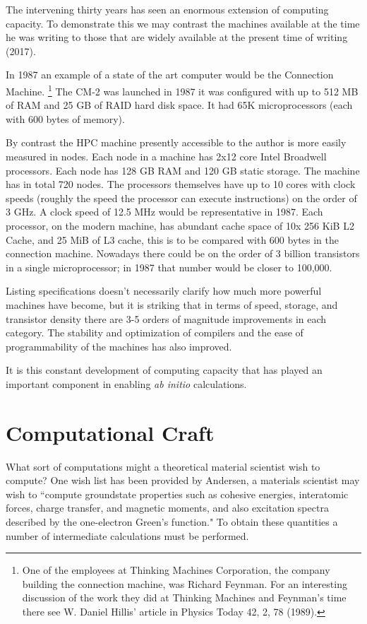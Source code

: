 The intervening thirty years has seen an enormous extension of computing capacity. 
To demonstrate this we may contrast the machines available at the time
he was writing to those that are widely available at the present time of writing (2017). 

In 1987 an example of a state of the art computer would be the Connection Machine.
\footnote{One of the employees at Thinking Machines Corporation,
the company building the connection machine, was Richard Feynman.
For an interesting discussion of the work they
did at Thinking Machines and Feynman's time there see W. Daniel
Hillis' article in Physics Today 42, 2, 78 (1989).}
The CM-2 was launched in 1987 it was configured with up to 512 MB of RAM and 25 GB of RAID
hard disk space. It had 65K microprocessors (each with 600 bytes of memory). 

By contrast the HPC machine presently accessible to the author 
is more easily measured in nodes. Each node in a machine has 2x12 core 
Intel Broadwell processors.
Each node has 128 GB RAM and 120 GB static storage. The machine has in total 720 nodes. 
The processors themselves have up to 10 cores with clock speeds (roughly the speed the
processor can execute instructions) on the order of 3 GHz. A clock speed of 12.5 MHz 
would be representative in 1987. 
Each processor, on the modern machine, has abundant cache 
space of 10x 256 KiB L2 Cache, and 25 MiB of L3 cache,
this is to be compared with 600 bytes in the connection machine. 
Nowadays there could be on the order of 3 billion 
transistors in a single microprocessor;
in 1987 that number would be closer to 100,000. 

Listing specifications doesn't necessarily clarify how much more powerful machines have become, 
but it is striking that in terms of speed, storage, and transistor density 
there are 3-5 orders of magnitude improvements in each category. 
The stability and optimization of compilers and the ease of programmability
of the machines has also improved.

It is this constant development of computing capacity that 
has played an important component in enabling {\it ab initio} calculations. 

\section{Computational Craft}
What sort of computations might a theoretical material scientist
wish to compute? One wish list has been provided by Andersen, a materials scientist
may wish to ``compute groundstate properties such as cohesive energies, interatomic forces, 
charge transfer, and magnetic moments, and also excitation spectra described 
by the one-electron Green's function."\cite{anderson75} To obtain these quantities a
number of intermediate calculations must be performed.

